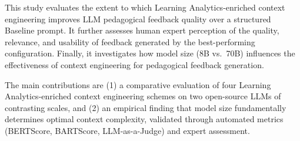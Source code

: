 \documentclass[conference,a4paper]{IEEEtran}
\begin{document}
%
%
%


This study evaluates the extent to which
Learning Analytics-enriched context engineering
improves LLM pedagogical feedback quality over
a structured Baseline prompt. It further assesses
human expert perception of the quality, relevance,
and usability of feedback generated by the
best-performing configuration. Finally, it
investigates how model size (8B vs.\ 70B)
influences the effectiveness of context engineering
for pedagogical feedback generation.

The main contributions are (1) a comparative evaluation of
four Learning Analytics-enriched context engineering schemes on two
open-source LLMs of contrasting scales, and (2) an empirical
finding that model size fundamentally determines optimal
context complexity, validated through automated metrics
(BERTScore, BARTScore, LLM-as-a-Judge) and expert assessment.
\end{document}
